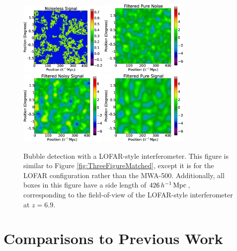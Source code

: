 \begin{figure}[h]
  \centering
  \includegraphics[width=4.2cm]{f12a.eps}
  \includegraphics[width=4.2cm]{f12b.eps}
  \includegraphics[width=4.2cm]{f12c.eps}
  \includegraphics[width=4.2cm]{f12d.eps}
  \caption{Bubble detection with a LOFAR-style interferometer. This figure is similar to Figure \ref{fig:ThreeFigureMatched}, except it is for the LOFAR configuration rather than the MWA-500. Additionally, all boxes in this figure have 
a side length of $426\,h^{-1}\,{\rm Mpc}\,$, corresponding to the field-of-view of the LOFAR-style
interferometer at $z = 6.9$.}
  \label{fig:ThreePanelLOFAR}
\end{figure}


\section{Comparisons to Previous Work} \label{sec:PreviousWork}

